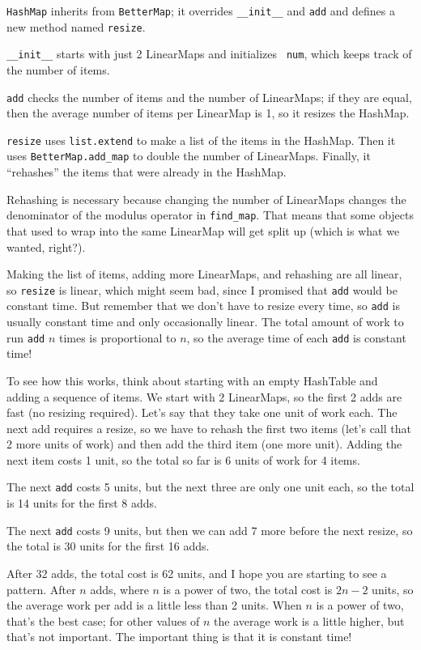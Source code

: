 \documentclass[10pt]{book}
\begin{document}
{\tt HashMap} inherits from {\tt BetterMap}; it overrides
\verb"__init__" and {\tt add} and defines a new method named
{\tt resize}.

\verb"__init__" starts with just 2 LinearMaps and initializes {\tt
  num}, which keeps track of the number of items.

{\tt add} checks the number of items and the number of LinearMaps;
if they are equal, then the average number of items per LinearMap
is 1, so it resizes the HashMap.

{\tt resize} uses {\tt list.extend} to make a list of
the items in the HashMap.  Then it uses
\verb"BetterMap.add_map" to double the number of LinearMaps.
Finally, it ``rehashes'' the items that were already in the
HashMap.

Rehashing is necessary because changing the number of LinearMaps
changes the denominator of the modulus operator in
\verb"find_map".  That means that some objects that used
to wrap into the same LinearMap will get split up (which is
what we wanted, right?).

Making the list of items,
adding more LinearMaps, and rehashing are all linear, so 
{\tt resize} is linear, which might seem bad, since I promised
that {\tt add} would be constant time.  But remember that
we don't have to resize every time, so {\tt add} is usually
constant time and only occasionally linear.  The total amount
of work to run {\tt add} $n$ times is proportional to $n$,
so the average time of each {\tt add} is constant time!

To see how this works, think about starting with an empty
HashTable and adding a sequence of items.  We start with 2 LinearMaps,
so the first 2 adds are fast (no resizing required).  Let's
say that they take one unit of work each.  The next add
requires a resize, so we have to rehash the first two
items (let's call that 2 more units of work) and then
add the third item (one more unit).  Adding the next item
costs 1 unit, so the total so far is
6 units of work for 4 items.

The next {\tt add} costs 5 units, but the next three
are only one unit each, so the total is 14 units for the
first 8 adds.

The next {\tt add} costs 9 units, but then we can add 7 more
before the next resize, so the total is 30 units for the
first 16 adds.

After 32 adds, the total cost is 62 units, and I hope you are starting
to see a pattern.  After $n$ adds, where $n$ is a power of two, the
total cost is $2n - 2$ units, so the average work per add is
a little less than 2 units.  When $n$ is a power of two, that's
the best case; for other values of $n$ the average work is a little
higher, but that's not important.  The important thing is that it
is constant time!
\end{document}
